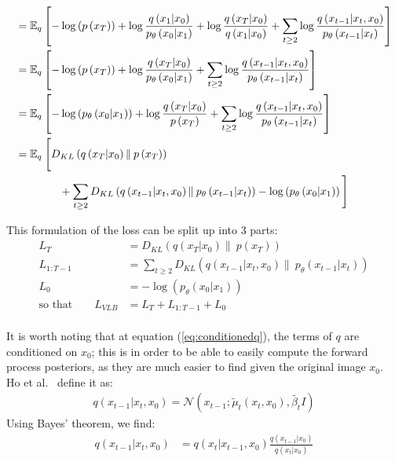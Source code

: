 \documentclass[twoside]{article}
\numberwithin{equation}{section}
\numberwithin{figure}{section}
\begin{document}
\begin{align}
  &= \mathbb{E}_q \left[-\log\left(p \left(x_T\right)\right) + \log \frac{q\left(x_1 | x_0\right)}{p_{\theta}\left(x_0 | x_1\right)} + \log \frac{q\left(x_T | x_0\right)}{q\left(x_1 | x_0\right)} + \sum_{t \geq 2} \log \frac{q\left(x_{t-1} | x_t, x_0\right)}{p_{\theta}\left(x_{t-1} | x_t\right)}\right] \\
  &= \mathbb{E}_q \left[-\log\left(p \left(x_T\right)\right) + \log \frac{q\left(x_T | x_0\right)}{p_{\theta}\left(x_0 | x_1\right)} + \sum_{t \geq 2} \log \frac{q\left(x_{t-1} | x_t, x_0\right)}{p_{\theta}\left(x_{t-1} | x_t\right)}\right] \\
  &= \mathbb{E}_q \left[- \log\left(p_{\theta}\left(x_0 | x_1\right)\right) + \log \frac{q\left(x_T | x_0\right)}{p \left(x_T\right)} + \sum_{t \geq 2} \log \frac{q\left(x_{t-1} | x_t, x_0\right)}{p_{\theta}\left(x_{t-1} | x_t\right)}\right] \\
  &= \mathbb{E}_q \: \Bigg[ D_{KL}\left(q\left(x_T | x_0\right) \| \: p\left(x_T\right)\right) \Bigg.  \\
  &\qquad \qquad \Bigg. + \sum_{t \geq 2} D_{KL}\left(q\left(x_{t-1} | x_t, x_0\right) \| \: p_{\theta}\left(x_{t-1} | x_t\right)\right) - \log\left(p_{\theta}\left(x_0 | x_1\right)\right) \Bigg] \notag
\end{align}

This formulation of the loss can be split up into 3 parts:
\begin{align}
  L_T &= D_{KL}\left(q\left(x_T | x_0\right) \| \: p\left(x_T\right)\right) \label{eq:lT}\\
  L_{1:T-1} &= \sum_{t \geq 2} D_{KL}\left(q\left(x_{t-1} | x_t, x_0\right) \| \: p_{\theta}\left(x_{t-1} | x_t\right)\right) \\
  L_0 &=  - \log\left(p_{\theta}\left(x_0 | x_1\right)\right) \\
  \text{so that} \qquad L_{VLB} &= L_T + L_{1:T-1} + L_0
\end{align}
\\
It is worth noting that at equation (\ref{eq:conditionedq}), the terms of $q$ are conditioned on $x_0$; this is in order to be able to easily compute the forward process posteriors, as they are much easier to find given the original image $x_0$. \\
Ho et al.~\cite{ho2020denoising} define it as:
\begin{gather}
  q\left(x_{t-1} | x_t, x_0\right) = \mathcal{N}\left(x_{t-1}; \tilde{\mu}_t \left(x_t, x_0\right), \tilde{\beta_t} I\right)
\end{gather}
Using Bayes' theorem, we find:
\begin{align}
  q\left(x_{t-1} | x_t, x_0\right) &= q\left(x_t | x_{t-1}, x_0\right) \frac{q\left(x_{t-1}| x_0\right)}{q\left(x_t | x_0\right)} \label{eq:ddpmbayes}
\end{align}
\end{document}
